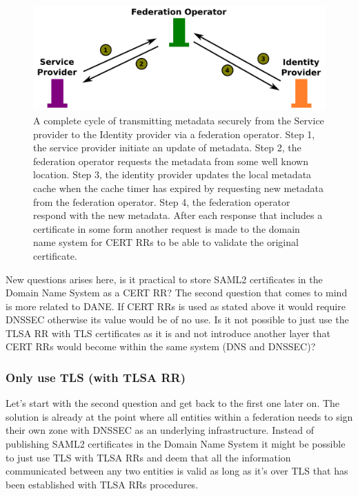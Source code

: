 \begin{figure}[ht]
\begin{center}
\includegraphics[scale=1]{Figures/saml2certsascertrr.png}
\end{center}
\caption{A complete cycle of transmitting metadata securely from the Service provider to the Identity provider via a federation operator.
Step 1, the service provider initiate an update of metadata.
Step 2, the federation operator requests the metadata from some well known location.
Step 3, the identity provider updates the local metadata cache when the cache timer has expired by requesting new metadata from the federation operator.
Step 4, the federation operator respond with the new metadata.
After each response that includes a certificate in some form another request is made to the domain name system for CERT RRs to be able to validate the original certificate. 
\label{ch4:saml2certsascertrr}}
\end{figure}



New questions arises here, is it practical to store SAML2 certificates in the Domain Name System as a CERT RR?
The second question that comes to mind is more related to DANE.
If CERT RRs is used as stated above it would require DNSSEC otherwise its value would be of no use.
Is it not possible to just use the TLSA RR with TLS certificates as it is and not introduce another layer that CERT RRs would become within the same system (DNS and DNSSEC)?

\subsubsection{Only use TLS (with TLSA RR)}
\label{subsec:only-tlsa-rr-with-tls}
Let's start with the second question and get back to the first one later on.
The solution is already at the point where all entities within a federation needs to sign their own zone with DNSSEC as an underlying infrastructure.
Instead of publishing SAML2 certificates in the Domain Name System it might be possible to just use TLS with TLSA RRs and deem that all the information communicated between any two entities is valid as long as it's over TLS that has been established with TLSA RRs procedures.

